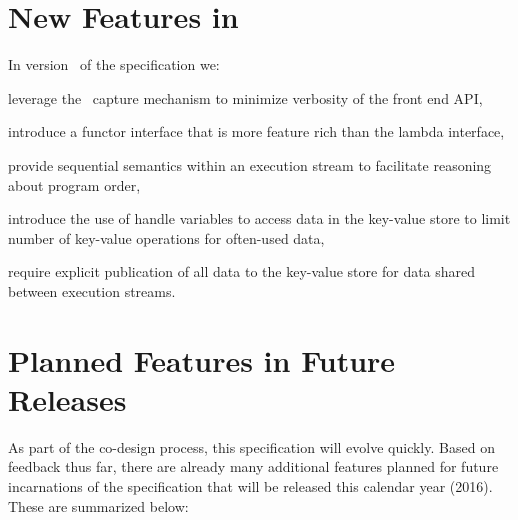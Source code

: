 \section{New Features in \specVersion}
\label{sec:current}
In version \specVersion\ of the specification we:
  \begin{compactenum}
\item leverage the \CC\ \gls{capture} mechanism to minimize verbosity of the \gls{front end}
    \gls{API},
  \item introduce a functor interface that is more feature rich than the
    \gls{lambda} interface,
\item provide \gls{sequential semantics} within an \gls{execution stream} to
    facilitate reasoning about program order,
\item introduce the use of
    \gls{handle} variables to access data in the \gls{key-value store} to limit number of key-value operations for often-used data,
\item require explicit publication of all data to the \gls{key-value store} for
  data shared between \glspl{execution stream}.
\end{compactenum}



\section{Planned Features in Future Releases}
\label{sec:future}

As part of the \gls{co-design} process, this specification will evolve quickly.
  Based on feedback thus far, there are already
many additional features planned for future incarnations of the specification that
will be released this calendar year (2016).  These are summarized below:

